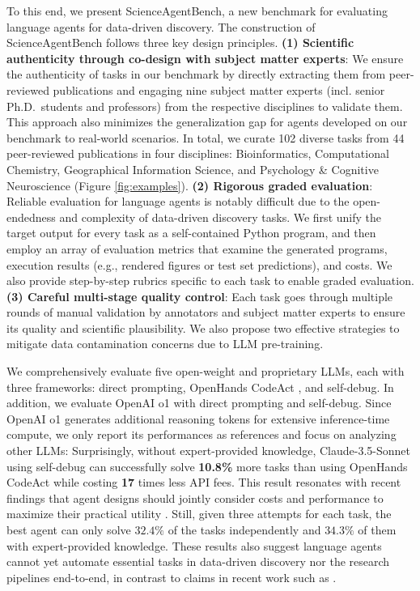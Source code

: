\documentclass{article} %
\newcommand{\bench}{ScienceAgentBench\xspace}
\begin{document}
%
To this end, we present \bench, a new benchmark for evaluating language agents for data-driven discovery. 
The construction of \bench follows three key design principles. 
\textbf{(1) Scientific authenticity through co-design with subject matter experts}: 
We ensure the authenticity of tasks in our benchmark by directly extracting them from peer-reviewed publications and engaging nine subject matter experts (incl. senior Ph.D.\ students and professors) from the respective disciplines to validate them.
This approach also minimizes the generalization gap for agents developed on our benchmark to real-world scenarios.
In total, we curate 102 diverse tasks from 44 peer-reviewed publications in four disciplines: Bioinformatics, Computational Chemistry, Geographical Information Science, and Psychology \& Cognitive Neuroscience (Figure \ref{fig:examples}).
\textbf{(2) Rigorous graded evaluation}: 
Reliable evaluation for language agents is notably difficult due to the open-endedness and complexity of data-driven discovery tasks. 
We first unify the target output for every task as a self-contained Python program, and then employ an array of evaluation metrics that examine the generated programs, execution results (e.g., rendered figures or test set predictions), and costs. 
We also provide step-by-step rubrics specific to each task to enable graded evaluation.
\textbf{(3) Careful multi-stage quality control}: 
Each task goes through multiple rounds of manual validation by annotators and subject matter experts to ensure its quality and scientific plausibility. 
We also propose two effective strategies to mitigate data contamination concerns due to LLM pre-training.
%

%
We comprehensively evaluate five open-weight and proprietary LLMs, each with three frameworks: direct prompting, OpenHands CodeAct \citep{wang2024opendevinopenplatformai}, and self-debug.
In addition, we evaluate OpenAI o1 with direct prompting and self-debug. 
Since OpenAI o1 generates additional reasoning tokens for extensive inference-time compute, we only report its performances as references and focus on analyzing other LLMs:
Surprisingly, without expert-provided knowledge, Claude-3.5-Sonnet using self-debug can successfully solve \textbf{10.8\%} more tasks than using OpenHands CodeAct while costing \textbf{17} times less API fees.
This result resonates with recent findings that agent designs should jointly consider costs and performance to maximize their practical utility \citep{kapoor2024aiagentsmatter}.
Still, given three attempts for each task, the best agent can only solve $32.4\%$ of the tasks independently and $34.3\%$ of them with expert-provided knowledge. 
These results also suggest language agents cannot yet automate essential tasks in data-driven discovery nor the research pipelines end-to-end, in contrast to claims in recent work such as \citet{lu2024aiscientistfullyautomated}.
%
\end{document}
